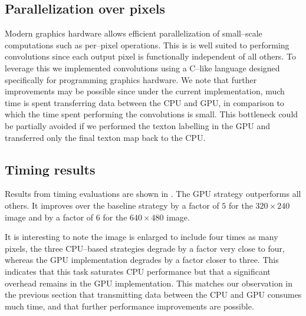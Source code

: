 \subsection{Parallelization over pixels}
Modern graphics hardware allows efficient parallelization of
small--scale computations such as per--pixel operations. This is is
well suited to performing convolutions since each output pixel is
functionally independent of all others. To leverage this we
implemented convolutions using a C--like language designed
specifically for programming graphics hardware. We note that further
improvements may be possible since under the current implementation,
much time is spent transferring data between the CPU and GPU, in
comparison to which the time spent performing the convolutions is
small. This bottleneck could be partially avoided if we performed the
texton labelling in the GPU and transferred only the final texton map
back to the CPU.

\subsection{Timing results}
Results from timing evaluations are shown in
. The GPU strategy outperforms all
others. It improves over the baseline strategy by a factor of $5$ for
the $320 \times 240$ image and by a factor of $6$ for the $640 \times
480$ image.


It is interesting to note  the image is
enlarged to include four times as many pixels, the three CPU--based
strategies degrade by a factor very close to four, whereas the GPU
implementation degrades by a factor closer to three. This indicates
that this task saturates CPU performance but that a significant
overhead remains in the GPU implementation. This matches our
observation in the previous section that transmitting data between the
CPU and GPU consumes much time, and that further performance
improvements are possible.



